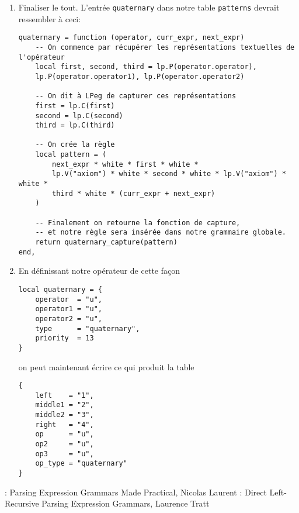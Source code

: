 \documentclass{article}
\begin{document}
\begin{enumerate}
	\begin{verbatim}
-- p est la règle
function quaternary_capture (p)
	-- On utilise l'opérateur de capture de LPeg
	return p / function (left, op1, middle1, op2, middle2, op3, right)
		-- Et on retourne juste une table.
		-- A savoir: on pourrait utiliser la fonction lpeg.Ct (Capture table),
		-- cependant il est préférable de définir nos clés nous-même, car lpeg.Ct
		-- retourne une table dont les clés sont des nombres (1, 2, ...)
		return {
			left    = left,
			op      = op1,
			op2     = op2,
			op3     = op3,
			middle1 = middle1,
			middle2 = middle2,
			right   = right,
			op_type = "quaternary"
		}
	end
end
	\end{verbatim}
	\item Finaliser le tout. L'entrée \lstinline|quaternary| dans notre table \lstinline|patterns| devrait ressembler à ceci:
	\begin{verbatim}
quaternary = function (operator, curr_expr, next_expr)
	-- On commence par récupérer les représentations textuelles de l'opérateur
	local first, second, third = lp.P(operator.operator), 
	lp.P(operator.operator1), lp.P(operator.operator2)
	
	-- On dit à LPeg de capturer ces représentations
	first = lp.C(first)
	second = lp.C(second)
	third = lp.C(third)
	
	-- On crée la règle
	local pattern = (
		next_expr * white * first * white *
		lp.V("axiom") * white * second * white * lp.V("axiom") * white *
		third * white * (curr_expr + next_expr)
	)
	
	-- Finalement on retourne la fonction de capture, 
	-- et notre règle sera insérée dans notre grammaire globale.
	return quaternary_capture(pattern)
end,
	\end{verbatim}
	\item En définissant notre opérateur de cette façon
	\begin{verbatim}
local quaternary = {
	operator  = "u",
	operator1 = "u",
	operator2 = "u",
	type      = "quaternary",
	priority  = 13
}
	\end{verbatim}
	on peut maintenant écrire  ce qui produit la table
	\begin{verbatim}
{
	left    = "1",
	middle1 = "2",
	middle2 = "3",
	right   = "4",
	op      = "u",
	op2     = "u",
	op3     = "u",
	op_type = "quaternary"
}
	\end{verbatim}
\end{enumerate}
\newpage
\noindent[1]: Parsing Expression Grammars Made Practical, Nicolas Laurent \newline
[2]: Direct Left-Recursive Parsing Expression Grammars, Laurence Tratt
\end{document}
